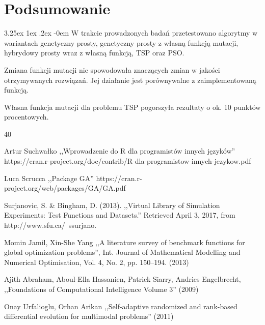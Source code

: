 \documentclass[11pt, a4paper]{article}
\makeatletter
\newcommand{\fbi}{\leavevmode{\parindent=1em\indent}}
\renewcommand\paragraph{\@startsection{paragraph}{5}{\z@}
  {3.25ex \@plus1ex \@minus.2ex}
  {-0em}
  {\normalfont\normalsize\bfseries}}
\makeatother
\begin{document}
\section{Podsumowanie}
\paragraph{}
W trakcie prowadzonych badań przetestowano algorytmy w wariantach genetyczny prosty, genetyczny prosty z własną funkcją mutacji, hybrydowy prosty wraz z własną funkcją, TSP oraz PSO.

\fbi
Zmiana funkcji mutacji nie spowodowała znaczących zmian w jakości otrzymywanych rozwiązań. Jej działanie jest porównywalne z zaimplementowaną funkcją.

\fbi
Własna funkcja mutacji dla problemu TSP pogorszyła rezultaty o ok. 10 punktów procentowych.



\newpage
\begin{thebibliography}{40}

Artur Suchwałko ,,Wprowadzenie do R dla programistów innych języków'' https://cran.r-project.org/doc/contrib/R-dla-programistow-innych-jezykow.pdf

Luca Scrucca ,,Package GA''
https://cran.r-project.org/web/packages/GA/GA.pdf

Surjanovic, S. \& Bingham, D. (2013). ,,Virtual Library of Simulation Experiments: Test Functions and Datasets.'' Retrieved April 3, 2017, from http://www.sfu.ca/~ssurjano.

Momin Jamil, Xin-She Yang ,,A literature survey of benchmark functions for global optimization problems'', Int. Journal of Mathematical Modelling and Numerical Optimisation, Vol. 4, No. 2, pp. 150–194. (2013)

Ajith Abraham, Aboul-Ella Hassanien, Patrick Siarry, Andries Engelbrecht, ,,Foundations of Computational Intelligence Volume 3'' (2009)

Onay Urfalioglu, Orhan Arikan ,,Self-adaptive randomized and rank-based differential evolution for multimodal problems'' (2011)

\end{thebibliography}
\end{document}
